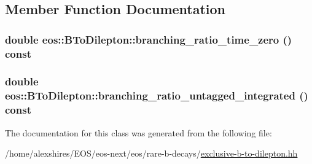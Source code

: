 \subsection{Member Function Documentation}
\hypertarget{classeos_1_1BToDilepton_abd3e3629c6477f74ada275e2033035f1}{
\subsubsection[{branching\_\-ratio\_\-time\_\-zero}]{\setlength{\rightskip}{0pt plus 5cm}double eos::BToDilepton::branching\_\-ratio\_\-time\_\-zero () const}}
\label{classeos_1_1BToDilepton_abd3e3629c6477f74ada275e2033035f1}
\hypertarget{classeos_1_1BToDilepton_afd43a14338c4bc5268b4b9c41ab14c7f}{
\subsubsection[{branching\_\-ratio\_\-untagged\_\-integrated}]{\setlength{\rightskip}{0pt plus 5cm}double eos::BToDilepton::branching\_\-ratio\_\-untagged\_\-integrated () const}}
\label{classeos_1_1BToDilepton_afd43a14338c4bc5268b4b9c41ab14c7f}


The documentation for this class was generated from the following file:\begin{DoxyCompactItemize}
\item 
/home/alexshires/EOS/eos-\/next/eos/rare-\/b-\/decays/\hyperlink{exclusive-b-to-dilepton_8hh}{exclusive-\/b-\/to-\/dilepton.hh}\end{DoxyCompactItemize}
